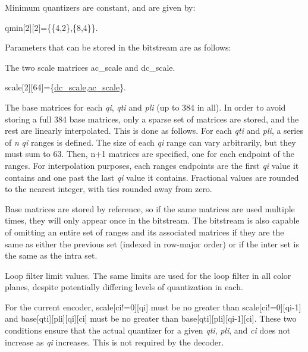 Minimum quantizers are constant, and are given by\+: 
\begin{DoxyCode}
qmin[2][2]=\{\{4,2\},\{8,4\}\}.
\end{DoxyCode}


Parameters that can be stored in the bitstream are as follows\+:
\begin{DoxyItemize}
\item The two scale matrices ac\+\_\+scale and dc\+\_\+scale. 
\begin{DoxyCode}
scale[2][64]=\{\hyperlink{structth__quant__info_ad5c1c0d1aa4127fcf864ae747d732ed9}{dc\_scale},\hyperlink{structth__quant__info_a102f079c8f4a135dc0895c10768aeb06}{ac\_scale}\}.
\end{DoxyCode}

\item The base matrices for each {\itshape qi}, {\itshape qti} and {\itshape pli} (up to 384 in all). In order to avoid storing a full 384 base matrices, only a sparse set of matrices are stored, and the rest are linearly interpolated. This is done as follows. For each {\itshape qti} and {\itshape pli}, a series of {\itshape n} {\itshape qi} ranges is defined. The size of each {\itshape qi} range can vary arbitrarily, but they must sum to 63. Then, {\ttfamily n+1} matrices are specified, one for each endpoint of the ranges. For interpolation purposes, each range\textquotesingle{}s endpoints are the first {\itshape qi} value it contains and one past the last {\itshape qi} value it contains. Fractional values are rounded to the nearest integer, with ties rounded away from zero.

Base matrices are stored by reference, so if the same matrices are used multiple times, they will only appear once in the bitstream. The bitstream is also capable of omitting an entire set of ranges and its associated matrices if they are the same as either the previous set (indexed in row-\/major order) or if the inter set is the same as the intra set.
\item Loop filter limit values. The same limits are used for the loop filter in all color planes, despite potentially differing levels of quantization in each.
\end{DoxyItemize}

For the current encoder, {\ttfamily scale\mbox{[}ci!=0\mbox{]}\mbox{[}qi\mbox{]}} must be no greater than {\ttfamily scale\mbox{[}ci!=0\mbox{]}\mbox{[}qi-\/1\mbox{]}} and {\ttfamily base\mbox{[}qti\mbox{]}\mbox{[}pli\mbox{]}\mbox{[}qi\mbox{]}\mbox{[}ci\mbox{]}} must be no greater than {\ttfamily base\mbox{[}qti\mbox{]}\mbox{[}pli\mbox{]}\mbox{[}qi-\/1\mbox{]}\mbox{[}ci\mbox{]}}. These two conditions ensure that the actual quantizer for a given {\itshape qti}, {\itshape pli}, and {\itshape ci} does not increase as {\itshape qi} increases. This is not required by the decoder. 

